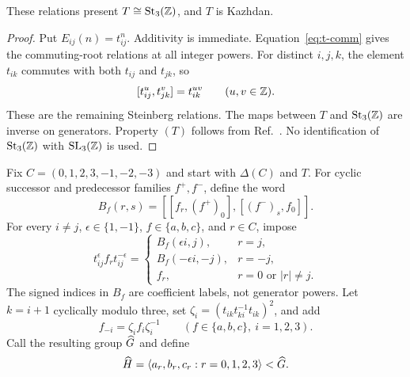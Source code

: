 \begin{lemma}\label{lem:steinberg}
These relations present $T\cong\operatorname{St}_3(\mathbb Z)$, and $T$ is Kazhdan.
\end{lemma}
\begin{proof}
Put $E_{ij}(n)=t_{ij}^n$. Additivity is immediate. Equation~\eqref{eq:t-comm} gives the
commuting-root relations at all integer powers. For distinct $i,j,k$, the element $t_{ik}$
commutes with both $t_{ij}$ and $t_{jk}$, so
\[
 [t_{ij}^u,t_{jk}^v]=t_{ik}^{uv}\qquad(u,v\in\mathbb Z).
\]
These are the remaining Steinberg relations. The maps between $T$ and $\operatorname{St}_3(\mathbb Z)$
are inverse on generators. Property $(T)$ follows from Ref.~\cite{ejz}. No identification
of $\operatorname{St}_3(\mathbb Z)$ with $\operatorname{SL}_3(\mathbb Z)$ is used.
\end{proof}

Fix $C=(0,1,2,3,-1,-2,-3)$ and start with $\Delta(C)$ and $T$. For cyclic successor and
predecessor families $f^+,f^-$, define the word
\begin{equation}
 B_f(r,s)=[[f_r,(f^+)_0],[(f^-)_s,f_0]].\label{eq:bword}
\end{equation}
For every $i\ne j$, $\epsilon\in\{1,-1\}$, $f\in\{a,b,c\}$, and $r\in C$, impose
\begin{equation}
 t_{ij}^{\epsilon}f_rt_{ij}^{-\epsilon}=
 \begin{cases}
 B_f(\epsilon i,j),&r=j,\\
 B_f(-\epsilon i,-j),&r=-j,\\
 f_r,&r=0\text{ or }|r|\ne j.
 \end{cases}\label{eq:conj-full}
\end{equation}
The signed indices in $B_f$ are coefficient labels, not generator powers. Let $k=i+1$
cyclically modulo three, set $\zeta_i=(t_{ik}t_{ki}^{-1}t_{ik})^2$, and add
\begin{equation}
 f_{-i}=\zeta_i f_i\zeta_i^{-1}
 \qquad(f\in\{a,b,c\},\ i=1,2,3).
 \label{eq:negative-names}
\end{equation}
Call the resulting group $\widehat G$ and define
\begin{equation}
 \widehat H=\langle a_r,b_r,c_r:r=0,1,2,3\rangle<\widehat G.
 \label{eq:hhat}
\end{equation}

